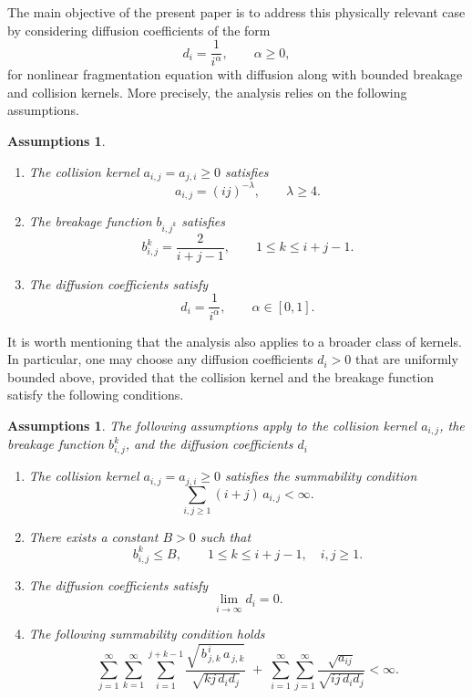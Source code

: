 \documentclass[a4paper,12pt,reqno]{amsart}
\theoremstyle{plain}
\newtheorem{assum}[thm]{Assumptions}
\numberwithin{equation}{section}
\begin{document}
	
	\medskip
	The main objective of the present paper is to address this physically relevant
	case by considering diffusion coefficients of the form
	\[
	d_i = \frac{1}{i^\alpha}, \qquad \alpha \ge 0,
	\]
	for nonlinear fragmentation equation with diffusion along with bounded breakage and collision kernels. More precisely, the analysis relies on the following assumptions.
	
	\begin{assum}\label{weaker assumption}
		\begin{enumerate}
			\item[(A1)] The collision kernel $a_{i,j}=a_{j,i}\ge0$ satisfies
			\[
			a_{i,j} = (ij)^{-\lambda}, \qquad \lambda \ge 4.
			\]
			
			\item[(A2)] The breakage function $b_{i,j^k}$ satisfies
			\[
			b_{i,j}^k = \frac{2}{i+j-1}, \qquad 1 \le k \le i+j-1.
			\]
			
			\item[(A3)] The diffusion coefficients satisfy
			\[
			d_i = \frac{1}{i^\alpha}, \qquad \alpha \in [0,1].
			\]
		\end{enumerate}
	\end{assum}
	
	It is worth mentioning that the analysis also applies to a broader class of kernels. In particular, one may choose any diffusion coefficients $d_i > 0$
	that are uniformly bounded above, provided that the collision kernel and the
	breakage function satisfy the following conditions.
	
	\begin{assum}\label{strong assumption}
		The following assumptions apply to the collision kernel $a_{i,j}$, the
		breakage function $b_{i,j}^k$, and the diffusion coefficients $d_i$
		
		\begin{enumerate}
			\item[(A1)] The collision kernel $a_{i,j}=a_{j,i}\ge0$ satisfies the summability condition
			\[
			\sum_{i,j \ge 1} (i+j)\, a_{i,j} < \infty.
			\]
			
			\item[(A2)] There exists a constant $B > 0$ such that
			\[
			b_{i,j}^k \le B, \qquad 1 \le k \le i+j-1, \quad i,j \ge 1.
			\]
			
			\item[(A3)] The diffusion coefficients satisfy
			\[
			\lim_{i \to \infty} d_i = 0.
			\]
			
			\item[(A4)] The following summability condition holds
			\[
			\sum_{j=1}^{\infty}
			\sum_{k=1}^{\infty}
			\sum_{i=1}^{j+k-1}
			\frac{\sqrt{\, b^{\,i}_{\,j,k}\, a_{\,j,k}}}{\sqrt{k j\, d_i d_j}}
			\;+\;
			\sum_{i=1}^{\infty}\sum_{j=1}^{\infty}
			\frac{\sqrt{a_{i j}}}{\sqrt{i j\, d_i d_j}}
			< \infty.
			\]
		\end{enumerate}
	\end{assum}
	
\end{document}
